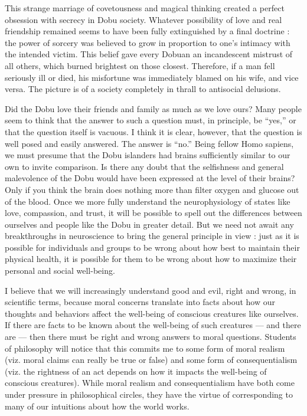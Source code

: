 \documentclass[a4paper,14pt]{extbook}
\begin{document}
This strange marriage of covetousness and magical thinking created a perfect obsession with secrecy in Dobu society.
Whatever possibility of love and real friendship remained seems to have been fully extinguished by a final doctrine :
the power of sorcery was believed to grow in proportion to one's intimacy with the intended victim.
This belief gave every Dobuan an incandescent mistrust of all others, which burned brightest on those closest.
Therefore, if a man fell seriously ill or died, his misfortune was immediately blamed on his wife, and vice versa.
The picture is of a society completely in thrall to antisocial delusions.

Did the Dobu love their friends and family as much as we love ours?
Many people seem to think that the answer to such a question must, in principle, be ``yes,'' or that the question itself is vacuous.
I think it is clear, however, that the question is well posed and easily answered.
The answer is ``no.''
Being fellow Homo sapiens, we must presume that the Dobu islanders had brains sufficiently similar to our own to invite comparison.
Is there any doubt that the selfishness and general malevolence of the Dobu would have been expressed at the level of their brains?
Only if you think the brain does nothing more than filter oxygen and glucose out of the blood.
Once we more fully understand the neurophysiology of states like love, compassion, and trust, it will be possible to spell out the differences between ourselves and people like the Dobu in greater detail.
But we need not await any breakthroughs in neuroscience to bring the general principle in view :
just as it is possible for individuals and groups to be wrong about how best to maintain their physical health, it is possible for them to be wrong about how to maximize their personal and social well-being.

I believe that we will increasingly understand good and evil, right and wrong, in scientific terms, because moral concerns translate into facts about how our thoughts and behaviors affect the well-being of conscious creatures like ourselves.
If there are facts to be known about the well-being of such creatures --- and there are --- then there must be right and wrong answers to moral questions.
Students of philosophy will notice that this commits me to some form of moral realism (viz. moral claims can really be true or false) and some form of consequentialism (viz. the rightness of an act depends on how it impacts the well-being of conscious creatures).
While moral realism and consequentialism have both come under pressure in philosophical circles, they have the virtue of corresponding to many of our intuitions about how the world works.
\end{document}
